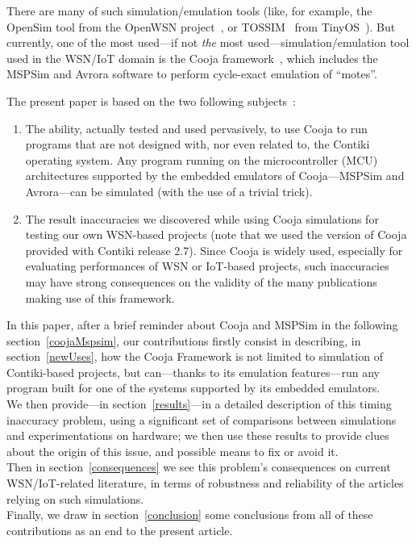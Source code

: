 \documentclass[10pt,emptycopyrightspace]{ewsn-proc}
\begin{document}
There are many of such simulation/emulation tools (like, for example,
the OpenSim tool from the OpenWSN project~\cite{OpenWSN}, or
TOSSIM~\cite{TOSSIM} from TinyOS~\cite{TinyOS}). But currently,
one of the most used---if not \emph{the} most used---simulation/emulation
tool used in the WSN/IoT domain is the Cooja framework~\cite{Cooja}, which
includes the MSPSim and Avrora software to perform cycle-exact emulation
of ``motes''.

\medskip

The present paper is based on the two following subjects~:
\begin{enumerate}

\item The ability, actually tested and used pervasively, to use Cooja
to run programs that are not designed with, nor even related to, the
Contiki operating system. Any program running on the microcontroller
(MCU) architectures supported by the embedded emulators of Cooja---MSPSim
and Avrora---can be simulated (with the use of a trivial trick).

\item The result inaccuracies we discovered while using Cooja simulations
for testing our own WSN-based projects (note that we used the version of
Cooja provided with Contiki release 2.7). Since Cooja is widely used,
 especially for evaluating performances of WSN or IoT-based projects,
such inaccuracies may have strong consequences on the validity of
the many publications making use of this framework.

\end{enumerate}

\medskip

In this paper, after a brief reminder about Cooja and MSPSim in the
following section~\ref{coojaMspsim}, our contributions firstly consist
in describing, in section~\ref{newUses}, how the Cooja Framework is not
limited to simulation of Contiki-based projects, but can---thanks to
its emulation features---run any program built for one of the systems
supported by its embedded emulators. \\
We then provide---in section~\ref{results}---in a detailed description
of this timing inaccuracy problem, using a significant set of comparisons
between simulations and experimentations on hardware; we then use
these results to provide clues about the origin of this issue, and
possible means to fix or avoid it. \\
Then in section~\ref{consequences} we see this problem's consequences
on current WSN/IoT-related literature, in terms of robustness and
reliability of the articles relying on such simulations. \\
Finally, we draw in section~\ref{conclusion} some conclusions from all
of these contributions as an end to the present article.
\end{document}
